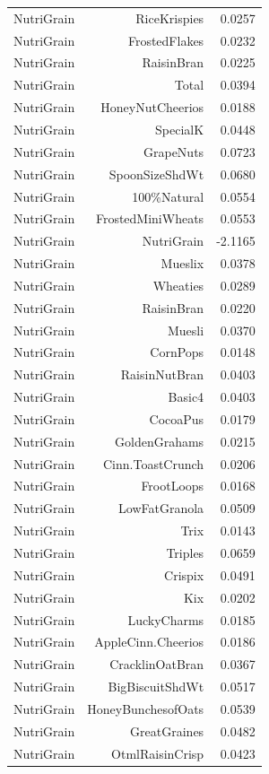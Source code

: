 \begin{longtable}{@{}lrr@{}}
NutriGrain & RiceKrispies & 0.0257 \\
NutriGrain & FrostedFlakes & 0.0232 \\
NutriGrain & RaisinBran & 0.0225 \\
NutriGrain & Total & 0.0394 \\
NutriGrain & HoneyNutCheerios & 0.0188 \\
NutriGrain & SpecialK & 0.0448 \\
NutriGrain & GrapeNuts & 0.0723 \\
NutriGrain & SpoonSizeShdWt & 0.0680 \\
NutriGrain & 100\%Natural & 0.0554 \\
NutriGrain & FrostedMiniWheats & 0.0553 \\
NutriGrain & NutriGrain & -2.1165 \\
NutriGrain & Mueslix & 0.0378 \\
NutriGrain & Wheaties & 0.0289 \\
NutriGrain & RaisinBran & 0.0220 \\
NutriGrain & Muesli & 0.0370 \\
NutriGrain & CornPops & 0.0148 \\
NutriGrain & RaisinNutBran & 0.0403 \\
NutriGrain & Basic4 & 0.0403 \\
NutriGrain & CocoaPus & 0.0179 \\
NutriGrain & GoldenGrahams & 0.0215 \\
NutriGrain & Cinn.ToastCrunch & 0.0206 \\
NutriGrain & FrootLoops & 0.0168 \\
NutriGrain & LowFatGranola & 0.0509 \\
NutriGrain & Trix & 0.0143 \\
NutriGrain & Triples & 0.0659 \\
NutriGrain & Crispix & 0.0491 \\
NutriGrain & Kix & 0.0202 \\
NutriGrain & LuckyCharms & 0.0185 \\
NutriGrain & AppleCinn.Cheerios & 0.0186 \\
NutriGrain & CracklinOatBran & 0.0367 \\
NutriGrain & BigBiscuitShdWt & 0.0517 \\
NutriGrain & HoneyBunchesofOats & 0.0539 \\
NutriGrain & GreatGraines & 0.0482 \\
NutriGrain & OtmlRaisinCrisp & 0.0423 \\

\end{longtable}
